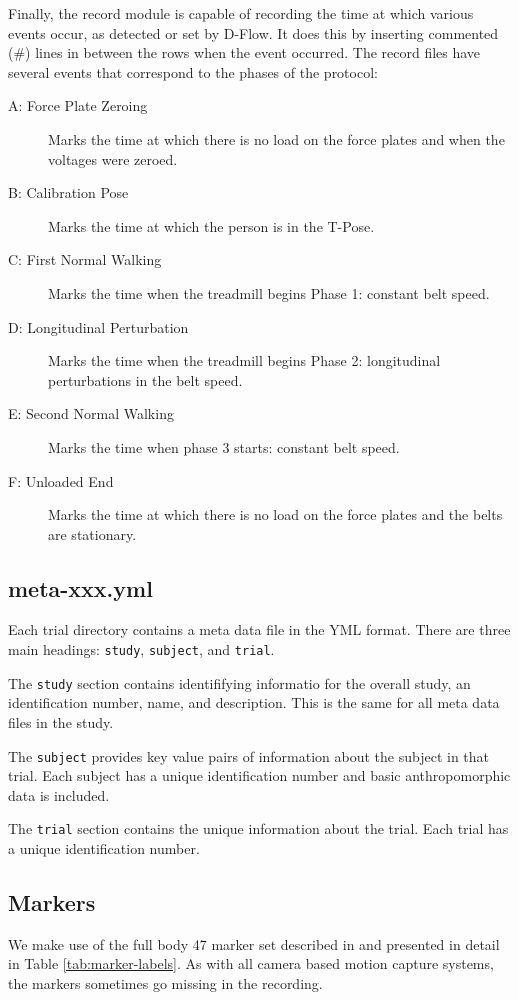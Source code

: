 \documentclass{article}
\begin{document}
Finally, the record module is capable of recording the time at which various
events occur, as detected or set by D-Flow. It does this by inserting commented
(\#) lines in between the rows when the event occurred. The record files have
several events that correspond to the phases of the protocol:

\begin{description}
  \item[A: Force Plate Zeroing] Marks the time at which there is no load on the
    force plates and when the voltages were zeroed.
  \item[B: Calibration Pose] Marks the time at which the person is in the
    T-Pose.
  \item[C: First Normal Walking] Marks the time when the treadmill begins Phase
    1: constant belt speed.
  \item[D: Longitudinal Perturbation] Marks the time when the treadmill begins
    Phase 2: longitudinal perturbations in the belt speed.
  \item[E: Second Normal Walking] Marks the time when phase 3 starts: constant
    belt speed.
  \item[F: Unloaded End] Marks the time at which there is no load on the force
    plates and the belts are stationary.
\end{description}

\subsection{meta-xxx.yml}

Each trial directory contains a meta data file in the YML format. There are
three main headings: \verb+study+, \verb+subject+, and \verb+trial+.

The \verb+study+ section contains identififying informatio for the overall
study, an identification number, name, and description. This is the same for
all meta data files in the study.

The \verb+subject+ provides key value pairs of information about the subject in
that trial. Each subject has a unique identification number and basic
anthropomorphic data is included.

The \verb+trial+ section contains the unique information about the trial. Each
trial has a unique identification number.


\subsection{Markers}
%
We make use of the full body 47 marker set described in \cite{Ton's HBM paper}
and presented in detail in Table \ref{tab:marker-labels}. As with all camera
based motion capture systems, the markers sometimes go missing in the
recording.
\end{document}
